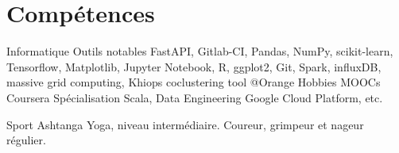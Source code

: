 \documentclass[]{friggeri-cv}
\begin{document}
\section{Compétences}

\begin{entrylist}
  \entry
    {Informatique}
    {Outils notables}
    {}
    {FastAPI, Gitlab-CI, Pandas, NumPy, scikit-learn, Tensorflow, Matplotlib, Jupyter Notebook, R, ggplot2, Git, Spark, influxDB, massive grid computing, Khiops coclustering tool @Orange}
  \entry
    {Hobbies}
    {MOOCs Coursera}
    {}
    {Spécialisation Scala, Data Engineering Google Cloud Platform, etc.}

  \entry
    {}
    {Sport}
    {}
    {Ashtanga Yoga, niveau intermédiaire. Coureur, grimpeur et nageur régulier.}
\end{entrylist}
\end{document}
